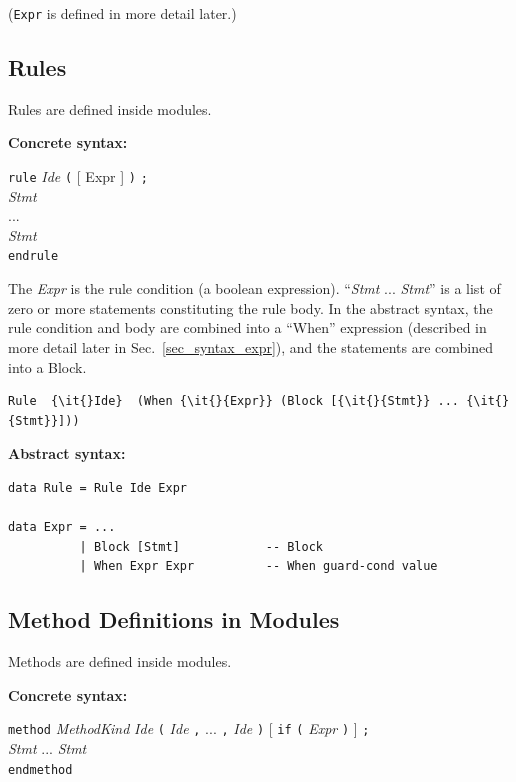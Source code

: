 \documentclass[11pt]{article}
\newcommand{\hm}{\hspace*{1em}}
\newcommand{\nterm}[1]{\emph{#1}}
\newcommand{\term}[1]{\texttt{#1}}
\newcommand{\many}[2]{#1 #2 ... #2 #1}
\newcommand{\opt}[1]{[ #1 ]}
\newcommand{\gram}[2]{    \hm\makebox[10em][l]{\it #1}\makebox[1.5em][l]{::=}    #2}
\newcommand{\grammore}[1]{\hm\makebox[10em][l]{      }\makebox[1.5em][l]{}       #1}
\begin{document}
(\term{Expr} is defined in more detail later.)


\subsection{Rules}

Rules are defined inside modules.

{\bf Concrete syntax:}

\gram{Rule}{\term{rule} \nterm{Ide} \term{(} \opt{Expr} \term{)} \term{;}} \\
\grammore{\hm \nterm{Stmt}} \\
\grammore{\hm ...} \\
\grammore{\hm \nterm{Stmt}} \\
\grammore{\term{endrule}}

The \nterm{Expr} is the rule condition (a boolean expression).
``\many{\nterm{Stmt}}{\hm}'' is a list of zero or more statements
constituting the rule body.  In the abstract syntax, the rule
condition and body are combined into a ``When'' expression (described
in more detail later in Sec.~\ref{sec_syntax_expr}), and the
statements are combined into a Block.

\begin{Verbatim}[frame=single, commandchars=\\\{\}]
    Rule  {\it{}Ide}  (When {\it{}{Expr}} (Block [{\it{}{Stmt}} ... {\it{}{Stmt}}]))
\end{Verbatim}

{\bf Abstract syntax:}

\begin{Verbatim}[frame=single, commandchars=\\\{\}]
data Rule = Rule Ide Expr

data Expr = ...
          | Block [Stmt]            -- Block
          | When Expr Expr          -- When guard-cond value
\end{Verbatim}



\subsection{Method Definitions in Modules}

Methods are defined inside modules.

{\bf Concrete syntax:}

\gram{MethodDef}{\term{method} \nterm{MethodKind} \nterm{Ide}
                 \term{(} \many{\nterm{Ide}}{\term{,}} \term{)}         %
                 \opt{\term{if} \term{(} \nterm{Expr} \term{)}}        %
                 \term{;}} \\
\grammore{\hm \many{\nterm{Stmt}}{\hm}} \\
\grammore{\term{endmethod}}
\end{document}
